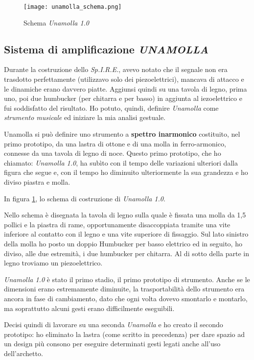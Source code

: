 \begin{figure}[t]
\centering
\texttt{[image: unamolla\_schema.png]}
\caption{Schema \emph{Unamolla 1.0}}
\label{fig:02_unamolla_01}
\end{figure}

\subsection{Sistema di amplificazione \textit{UNAMOLLA}}

Durante la costruzione dello \emph{Sp.I.R.E.}, avevo notato che il segnale non era
trasdotto perfettamente (utilizzavo solo dei piezoelettrici), mancava di attacco
e le dinamiche erano davvero piatte. Aggiunsi quindi su una tavola di legno,
prima uno, poi due humbucker (per chitarra e per basso) in aggiunta al
iezoelettrico e fui soddisfatto del risultato. Ho potuto, quindi, definire
\textit{Unamolla} come \textit{strumento musicale} ed iniziare la mia analisi
gestuale.

Unamolla si può definire uno strumento a \textbf{spettro inarmonico} costituito,
nel primo prototipo, da una lastra di ottone e di una molla in ferro-armonico,
connesse da una tavola di legno di noce. Questo primo prototipo, che ho chiamato:
\emph{Unamolla 1.0}, ha subìto con il tempo delle variazioni ulteriori dalla figura che
segue e, con il tempo ho diminuito ulteriormente la sua grandezza e ho diviso
piastra e molla.

In figura \ref{fig:02_unamolla_01}, lo schema di costruzione di \emph{Unamolla 1.0}.

Nello schema è disegnata la tavola di legno sulla quale è fissata una molla da
1,5 pollici e la piastra di rame, opportunamente disaccoppiata tramite una vite
inferiore al contatto con il legno e una vite superiore di fissaggio. Sul lato
sinistro della molla ho posto un doppio Humbucker per basso elettrico ed in
seguito, ho diviso, alle due estremità, i due humbucker per chitarra. Al di
sotto della parte in legno troviamo un piezoelettrico.

\emph{Unamolla 1.0} è stato il primo stadio, il primo prototipo di strumento. Anche se
le dimensioni erano estremamente diminuite, la trasportabilità dello strumento
era ancora in fase di cambiamento, dato che ogni volta dovevo smontarlo e
montarlo, ma soprattutto alcuni gesti erano difficilmente eseguibili.

Decisi quindi di lavorare su una seconda \textit{Unamolla}  e ho creato il secondo
prototipo: ho eliminato la lastra (come scritto in precedenza) per dare spazio
ad un design più consono per eseguire determinati gesti legati anche all’uso
dell’archetto.

